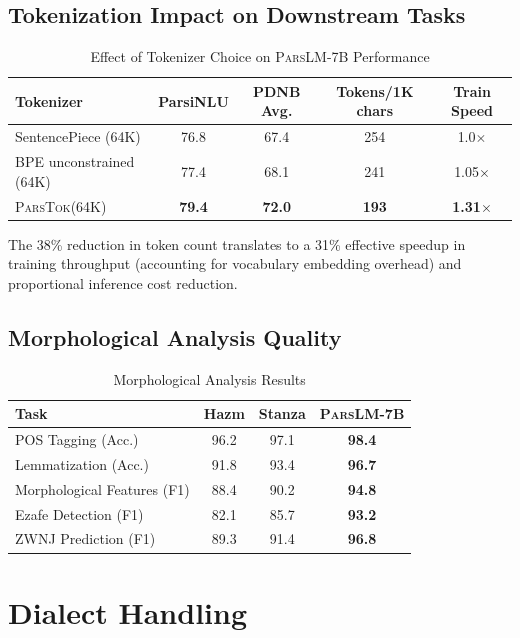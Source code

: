 \documentclass[11pt,a4paper]{article}
\newcommand{\parslm}{\textsc{ParsLM}\xspace}
\newcommand{\parstok}{\textsc{ParsTok}\xspace}
\begin{document}
\subsection{Tokenization Impact on Downstream Tasks}

\begin{table}[H]
\centering
\caption{Effect of Tokenizer Choice on \parslm-7B Performance}
\label{tab:tok-impact}
\begin{tabular}{lcccc}
\toprule
\textbf{Tokenizer} & \textbf{ParsiNLU} & \textbf{PDNB Avg.} & \textbf{Tokens/1K chars} & \textbf{Train Speed} \\
\midrule
SentencePiece (64K) & 76.8 & 67.4 & 254 & 1.0$\times$ \\
BPE unconstrained (64K) & 77.4 & 68.1 & 241 & 1.05$\times$ \\
\parstok (64K) & \textbf{79.4} & \textbf{72.0} & \textbf{193} & \textbf{1.31$\times$} \\
\bottomrule
\end{tabular}
\end{table}

The 38\% reduction in token count translates to a 31\% effective speedup in training throughput (accounting for vocabulary embedding overhead) and proportional inference cost reduction.

\subsection{Morphological Analysis Quality}

\begin{table}[H]
\centering
\caption{Morphological Analysis Results}
\label{tab:morph}
\begin{tabular}{lccc}
\toprule
\textbf{Task} & \textbf{Hazm} & \textbf{Stanza} & \textbf{\parslm-7B} \\
\midrule
POS Tagging (Acc.) & 96.2 & 97.1 & \textbf{98.4} \\
Lemmatization (Acc.) & 91.8 & 93.4 & \textbf{96.7} \\
Morphological Features (F1) & 88.4 & 90.2 & \textbf{94.8} \\
Ezafe Detection (F1) & 82.1 & 85.7 & \textbf{93.2} \\
ZWNJ Prediction (F1) & 89.3 & 91.4 & \textbf{96.8} \\
\bottomrule
\end{tabular}
\end{table}

\section{Dialect Handling}
\end{document}
